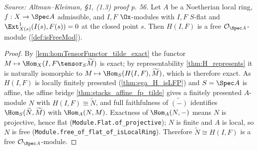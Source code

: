 \begin{theorem}

\leanok
[Freeness of $H$ at $\Spec A$ from $T = 0$]
  \label{thm:H_free_of_functorT_zero}
  \textit{Source: Altman--Kleiman, §1, (1.3) proof p. 56.}
  Let $A$ be a Noetherian local ring, $f : X \to \Spec A$ admissible, and $I, F$
  $\Ox$-modules with $I, F$ $S$-flat and $\Ext^1_{X(s)}(I(s),F(s)) = 0$ at the
  closed point $s$. Then $H(I,F)$ is a free $\mathcal{O}_{\Spec A}$-module
  (\cref{def:isFreeMod}).
  \begin{proof}
    By \cref{lem:homTensorFunctor_tilde_exact} the functor
    $M \mapsto \Hom_X(I, F\tensor_S\widetilde M)$ is exact; by representability
    \cref{thm:H_represents} it is naturally isomorphic to
    $M \mapsto \Hom_S(H(I,F), \widetilde M)$, which is therefore exact. As $H(I,F)$
    is locally finitely presented (\cref{thm:ega_H_isLFP}) and $S = \Spec A$ is
    affine, the affine bridge \cref{thm:stacks_affine_fp_tilde} gives a finitely
    presented $A$-module $N$ with $H(I,F) \cong \widetilde N$, and full faithfulness
    of $\widetilde{(-)}$ identifies $\Hom_S(\widetilde N, \widetilde M)$ with
    $\Hom_A(N, M)$. Exactness of $\Hom_A(N, -)$ means $N$ is projective, hence flat
    (\texttt{Module.Flat.of\_projective}); $N$ is finite and $A$ is local, so $N$ is
    free (\texttt{Module.free\_of\_flat\_of\_isLocalRing}). Therefore
    $\widetilde N \cong H(I,F)$ is a free $\mathcal{O}_{\Spec A}$-module.
  \end{proof}
\end{theorem}

